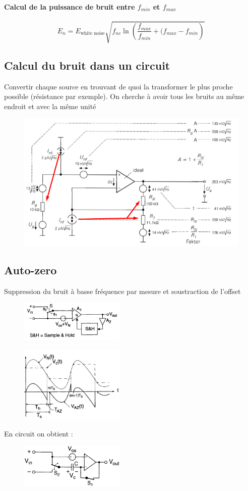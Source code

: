 \documentclass[resume]{subfiles}
\begin{document}
\begin{multicols}{3}
\paragraph{Calcul de la puissance de bruit entre $f_{min}$ et $f_{max}$}
$$E_n=E_{\text{white noise}}\sqrt{f_{nc}\ln\left(\frac{f_{max}}{f_{min}}+(f_{max}-f_{min}\right)}$$
\subsection{Calcul du bruit dans un circuit}
Convertir chaque source en trouvant de quoi la transformer le plus proche possible (résistance par exemple). On cherche à avoir tous les bruits au même endroit et avec la même unité
\begin{figure}[H]
\centering
\includegraphics[width=0.9\columnwidth]{img_79.png}
\end{figure}
\subsection{Auto-zero}
Suppression du bruit à basse fréquence par mesure et soustraction de l'offset
\begin{figure}[H]
\centering
\includegraphics[width=5.00cm]{img_80.png}
\end{figure}
\begin{figure}[H]
\centering
\includegraphics[width=5.00cm]{img_81.png}
\end{figure}
En circuit on obtient :
\begin{figure}[H]
\centering
\includegraphics[width=5.00cm]{img_82.png}
\end{figure}

\end{multicols}
\end{document}
